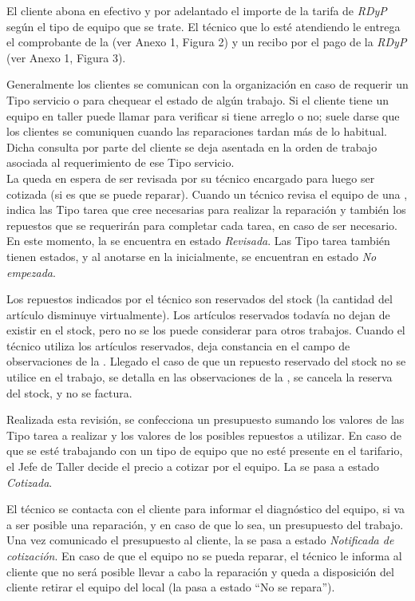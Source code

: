 \documentclass[12pt]{extarticle}
\begin{document}
\begin{spacing}{1.2}
    El cliente abona en efectivo y por adelantado el importe de la tarifa de \textit{RDyP} según el tipo de equipo que se trate. El técnico que lo esté atendiendo le entrega el comprobante de la \OT{} (ver Anexo 1, Figura 2) y un recibo por el pago de la \textit{RDyP} (ver Anexo 1, Figura 3). 

    Generalmente los clientes se comunican con la organización en caso de requerir un Tipo servicio o para chequear el estado de algún trabajo. Si el cliente tiene un equipo en taller puede llamar para verificar si tiene arreglo o no; suele darse que los clientes se comuniquen cuando las reparaciones tardan más de lo habitual. Dicha consulta por parte del cliente se deja asentada en la orden de trabajo asociada al requerimiento de ese Tipo servicio.\\

    La \OT{} queda en espera de ser revisada por su técnico encargado para luego ser cotizada (si es que se puede reparar).
    Cuando un técnico revisa el equipo de una \OT{}, indica las Tipo tarea que cree necesarias para realizar la reparación y también los repuestos que se requerirán para completar cada tarea, en caso de ser necesario. En este momento, la \OT{} se encuentra en estado \textit{Revisada}. Las Tipo tarea también tienen estados, y al anotarse en la \OT{} inicialmente, se encuentran en estado \textit{No empezada}.
    
    Los repuestos indicados por el técnico son reservados del stock (la cantidad del artículo disminuye virtualmente). Los artículos reservados todavía no dejan de existir en el stock, pero no se los puede considerar para otros trabajos. Cuando el técnico utiliza los artículos reservados, deja constancia en el campo de observaciones de la \OT{}.  Llegado el caso de que un repuesto reservado del stock no se utilice en el trabajo, se detalla en las observaciones de la \OT{}, se cancela la reserva del stock, y no se factura.

    Realizada esta revisión, se confecciona un presupuesto sumando los valores de las Tipo tarea a realizar y los valores de los posibles repuestos a utilizar. En caso de que se esté trabajando con un tipo de equipo que no esté presente en el tarifario, el Jefe de Taller decide el precio a cotizar por el equipo. La \OT{} se pasa a estado \textit{Cotizada}.
    
    El técnico se contacta con el cliente para informar el diagnóstico del equipo, si va a ser posible una reparación, y en caso de que lo sea, un presupuesto del trabajo. Una vez comunicado el presupuesto al cliente, la \OT{} se pasa a estado \textit{Notificada de cotización}. En caso de que el equipo no se pueda reparar, el técnico le informa al cliente que no será posible llevar a cabo la reparación y queda a disposición del cliente retirar el equipo del local (la \OT{} pasa a estado ``No se repara'').
  

\end{spacing}
\end{document}

